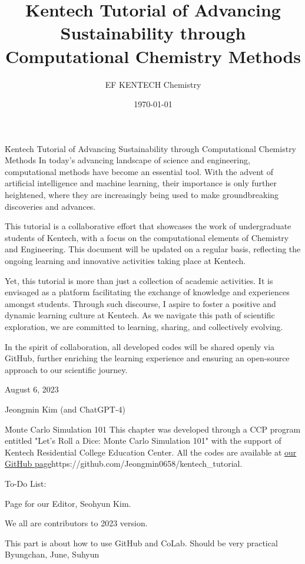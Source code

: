 \documentclass{textbook}
\title     {Kentech Tutorial of Advancing Sustainability through Computational Chemistry Methods}
\author     {EF KENTECH Chemistry}
\date       {\today}
\begin{document}
\h*{Kentech Tutorial of Advancing Sustainability through Computational Chemistry Methods} %
In today's advancing landscape of science and engineering,  computational methods have become an essential tool. With the advent of artificial intelligence and machine learning, their importance is only further heightened, where they are increasingly being used to make groundbreaking discoveries and advances.

This tutorial is a collaborative effort that showcases the work of undergraduate students of Kentech, with a focus on the computational elements of Chemistry and Engineering. This document will be updated on a regular basis, reflecting the ongoing learning and innovative activities taking place at Kentech.

Yet, this tutorial is more than just a collection of academic activities. It is envisaged as a platform facilitating the exchange of knowledge and experiences amongst students. Through such discourse, I aspire to foster a positive and dynamic learning culture at Kentech. As we navigate this path of scientific exploration, we are committed to learning, sharing, and collectively evolving.

In the spirit of collaboration, all developed codes will be shared openly via GitHub, further enriching the learning experience and ensuring an open-source approach to our scientific journey.

August 6, 2023

Jeongmin Kim (and ChatGPT-4)

\toc
\h{Monte Carlo Simulation 101}
This chapter was developed through a CCP program entitled "Let's Roll a Dice: Monte Carlo Simulation 101" with the support of Kentech Residential College Education Center.
All the codes are available at \url{our GitHub page}{https://github.com/Jeongmin0658/kentech_tutorial}.

To-Do List:

Page for our Editor, Seohyun Kim.

We all are contributors to 2023 version. 

This part is about how to use GitHub and CoLab. Should be very practical
Byungchan, June, Suhyun
\end{document}

